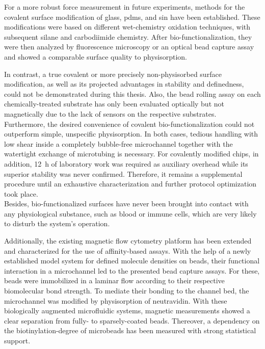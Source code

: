 For a more robust force measurement in future experiments, methods for the covalent surface modification of glass, \gls{pdms}, and \gls{sin} have been established. These modifications were based on different wet-chemistry oxidation techniques, with subsequent silane and carbodiimide chemistry. After bio-functionalization, they were then analyzed by fluorescence microscopy or an optical bead capture assay and showed a comparable surface quality to physisorption.

In contrast, a true covalent or more precisely non-physisorbed surface modification, as well as its projected advantages in stability and definedness, could not be demonstrated during this thesis. Also, the bead rolling assay on each chemically-treated substrate has only been evaluated optically but not magnetically due to the lack of sensors on the respective substrates.\\
Furthermore, the desired convenience of covalent bio-functionalization could not outperform simple, unspecific physisorption. In both cases, tedious handling with low shear inside a completely bubble-free microchannel together with the watertight exchange of microtubing is necessary. For covalently modified chips, in addition, \SI{12}{\hour} of laboratory work was required as auxiliary overhead while its superior stability was never confirmed. Therefore, it remains a supplemental procedure until an exhaustive characterization and further protocol optimization took place.\\
Besides, bio-functionalized surfaces have never been brought into contact with any physiological substance, such as blood or immune cells, which are very likely to disturb the system's operation.

Additionally, the existing magnetic flow cytometry platform has been extended and characterized for the use of affinity-based assays. With the help of a newly established model system for defined molecule densities on beads, their functional interaction in a microchannel led to the presented bead capture assays. For these, beads were immobilized in a laminar flow according to their respective biomolecular bond strength. To mediate their bonding to the channel bed, the microchannel was modified by physisorption of neutravidin. With these biologically augmented microfluidic systems, magnetic measurements showed a clear separation from fully- to sparsely-coated beads. Thereover, a dependency on the biotinylation-degree of microbeads has been measured with strong statistical support.
\cleardoublepage




%
%
%
%
%
%
